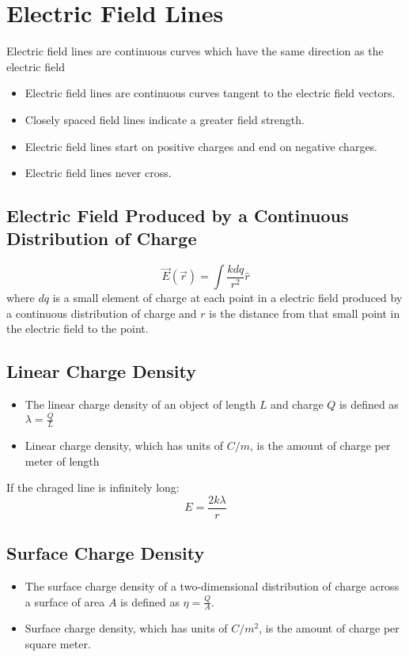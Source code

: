 \documentclass{article}
\begin{document}
\setlength{\parindent}{0pt}
\setlength{\parskip}{1em}
\section*{Electric Field Lines}
Electric field lines are continuous curves which have the same direction as the electric field

\begin{itemize}
    \item Electric field lines are continuous curves tangent to the electric field vectors.
    \item Closely spaced field lines indicate a greater field strength.
    \item Electric field lines start on positive charges and end on negative charges.
    \item Electric field lines never cross.
\end{itemize}

\subsection*{Electric Field Produced by a Continuous Distribution of Charge}
\[\vec{E}(\vec{r})=\int \frac{kdq}{r^2}\hat{r}\]
where $dq$ is a small element of charge at each point in a electric field produced by a continuous
distribution of charge and $r$ is the distance from that small point in the electric field to the
point.

\subsection*{Linear Charge Density}
\begin{itemize}
    \item The linear charge density of an object of length $L$ and charge $Q$ is defined as
    $\lambda=\frac{Q}{L}$
    \item Linear charge density, which has units of $C/m$, is the amount of charge per meter of
    length
\end{itemize}

If the chraged line is infinitely long:
\[E=\frac{2k\lambda}{r}\]

\subsection*{Surface Charge Density}
\begin{itemize}
    \item The surface charge density of a two-dimensional distribution of charge across a surface
    of area $A$ is defined as $\eta = \frac{Q}{A}$.
    \item Surface charge density, which has units of $C/m^2$, is the amount of charge per square
    meter.
\end{itemize}
\end{document}
